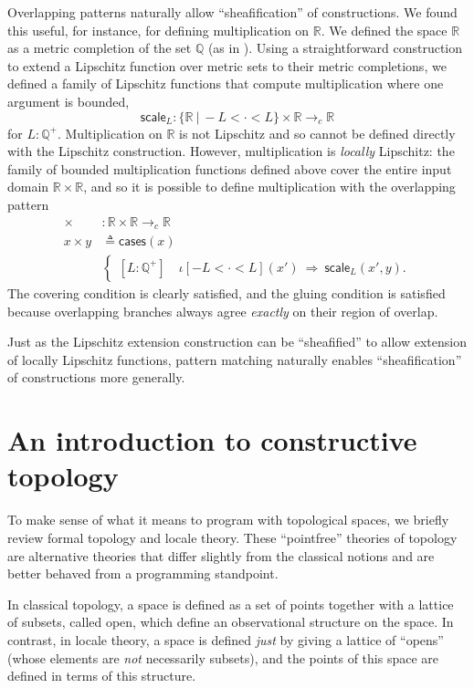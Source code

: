 \documentclass[conference]{IEEEtran}
\newcommand{\cto}{\to_c}
\newcommand{\R}{\mathbb{R}}
\newcommand{\rat}{\mathbb{Q}}
\newcommand{\suchthat}{\ |\ }
\newcommand{\oinclf}[1]{\iota[{#1}]}
\newcommand{\oincl}[2]{\oinclf{#1} \left({#2}\right)}
\newcommand{\Branch}{\Rightarrow}
\begin{document}
Overlapping patterns naturally allow ``sheafification'' of constructions. We found this useful, for instance, for defining multiplication on $\R$. We defined the space $\R$ as a metric completion of the set $\rat$ (as in \cite{vickersmetric}). Using a straightforward construction to extend  a Lipschitz function over metric sets to their metric completions, we defined a family of Lipschitz functions that compute multiplication where one argument is bounded,
\[
\mathsf{scale}_L : \{ \R \suchthat -L < \cdot < L \} \times \R \cto \R
\]
for $L : \rat^+$. Multiplication on $\R$ is not Lipschitz and so cannot be defined directly with the Lipschitz construction. However, multiplication is \emph{locally} Lipschitz: the family of bounded multiplication functions defined above cover the entire input domain $\R \times \R$, and so it is possible to define multiplication with the overlapping pattern
\begin{align*}
\times &: \R \times \R \cto \R
\\ x \times y &\triangleq
\mathsf{cases}(x)
\\
&\begin{cases}
[L : \rat^+] \quad \oincl{-L < \cdot < L}{x'}  \  \Branch \  \mathsf{scale}_L(x', y).
\end{cases}
\end{align*}
The covering condition is clearly satisfied, and the gluing condition is satisfied because overlapping branches always agree \emph{exactly} on their region of overlap.

Just as the Lipschitz extension construction can be ``sheafified'' to allow extension of locally Lipschitz functions, pattern matching naturally enables ``sheafification'' of constructions more generally.

\section{An introduction to constructive topology}
\label{s:topology}

To make sense of what it means to program with topological spaces, we briefly review formal topology and locale theory. These ``pointfree'' theories of topology are alternative theories that differ slightly from the classical notions and are better behaved from a programming standpoint.

In classical topology, a space is defined as a set of points together with a lattice of subsets, called open, which define an observational structure on the space. In contrast, in locale theory, a space is defined \emph{just} by giving a lattice of ``opens'' (whose elements are \emph{not} necessarily subsets), and the points of this space are defined in terms of this structure.
\end{document}
